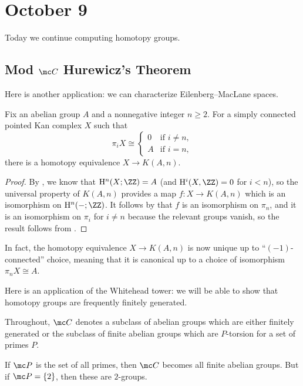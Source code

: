 \documentclass[../notes.tex]{subfiles}
\begin{document}
\section{October 9}
Today we continue computing homotopy groups.

\subsection{Mod \texorpdfstring{$\mc C$}{C} Hurewicz's Theorem}
Here is another application: we can characterize Eilenberg--MacLane spaces.
\begin{proposition} \label{prop:characterize-eilenberg-maclane}
	Fix an abelian group $A$ and a nonnegative integer $n\ge2$. For a simply connected pointed Kan complex $X$ such that
	\[\pi_iX\cong\begin{cases}
		0 & \text{if }i\ne n, \\
		A & \text{if }i=n,
	\end{cases}\]
	there is a homotopy equivalence $X\to K(A,n)$.
\end{proposition}
\begin{proof}
	By , we know that $\mathrm H^n(X;\ZZ)=A$ (and $\mathrm H^i(X,\ZZ)=0$ for $i<n$), so the universal property of $K(A,n)$ provides a map $f\colon X\to K(A,n)$ which is an isomorphism on $\mathrm H^n(-;\ZZ)$. It follows by  that $f$ is an isomorphism on $\pi_n$, and it is an isomorphism on $\pi_i$ for $i\ne n$ because the relevant groups vanish, so the result follows from .
\end{proof}
\begin{remark}
	In fact, the homotopy equivalence $X\to K(A,n)$ is now unique up to ``$(-1)$-connected'' choice, meaning that it is canonical up to a choice of isomorphism $\pi_nX\cong A$.
\end{remark}
Here is an application of the Whitehead tower: we will be able to show that homotopy groups are frequently finitely generated.
\begin{notation} \label{not:class-c}
	Throughout, $\mc C$ denotes a subclass of abelian groups which are either finitely generated or the subclass of finite abelian groups which are $P$-torsion for a set of primes $P$.
\end{notation}
\begin{example}
	If $\mc P$ is the set of all primes, then $\mc C$ becomes all finite abelian groups. But if $\mc P=\{2\}$, then these are $2$-groups.
\end{example}
\end{document}
